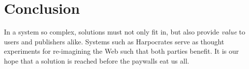\section{Conclusion}
In a system so complex, solutions must not only fit in, but also provide \textit{value} to users and publishers alike.
Systems such as Harpocrates serve as thought experiments for re-imagining the Web such that both parties benefit.
It is our hope that a solution is reached before the paywalls eat us all.
